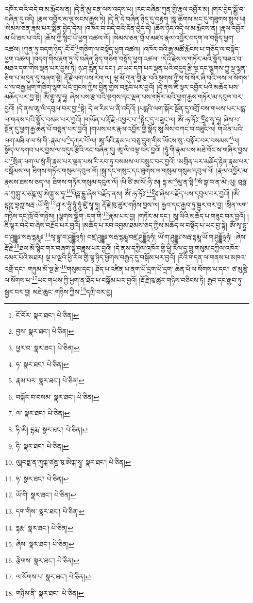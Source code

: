 འཁོར་བའི་བདེ་བ་མ་རྨོངས་ན། །དེ་ནི་མྱ་ངན་ལས་འདས་པ། །རང་བཞིན་ཀུན་གྱི་རྣལ་འབྱོར་མ། །གར་བྱེད་སྨྱོ་བ་བཞིན་དུ་འདི། །རྣལ་འབྱོར་མ་ལྔ་སངས་རྒྱས་ཏེ། །དེ་ནི་དེ་བཞིན་ཉིད་དུ་བརྟག །སྣ་ཆོགས་མང་དུ་གཟུགས་སྤྲུལ་པ། །སེམས་ཅན་རྣམ་པར་སྨིན་བྱེད་དེས། །འཁོར་བ་བདེ་བའི་དོན་བྱེད་དེ། །ཆོས་ཉིད་འདི་ལ་མ་རྨོངས་ན། །རྣལ་འབྱོར་མ་ཡི་ཐར་པ་འདི། །ཆོས་ཀྱི་སྙིང་པོ་ཕྱག་འཚལ་ལོ། །སེམས་ཅན་གྲོལ་མཛད་རྣལ་འབྱོར་བདག་ལ་བསྟོད་ཕྱག་འཚལ། །ཀུན་ཏུ་བདག་ཉིད་:ངོ་བོ་\footnote{ངོ་བོར་  སྣར་ཐང་།  པེ་ཅིན། }གཅིག་ལ་བསྟོད་ཕྱག་འཚལ། །འཁོར་བའི་རྒྱ་མཚོ་རྨོངས་པ་གཅོད་ལ་བསྟོད་ཕྱག་འཚལ། །བདག་གིས་རྟག་ཏུ་དེ་བཞིན་ཉིད་གཅིག་བསྟོད་ཕྱག་འཚལ། །དེའི་རྗེས་ལ་གཏོར་མའི་སྣོད་བཟའ་བ་མཐའ་དག་གིས་ལྡན་པར་བྱས་ཏེ། ཉ་ཤ་རློན་པ་དང་། ཤ་ཡང་དག་པར་ལྡན་པའི་བདུད་རྩི་ལྔ་དང་ལྕགས་ཀྱུ་ལྔ་ལྷན་ཅིག་པ་མདུན་དུ་བཞག་སྟེ། རྡོ་རྗེ་ལག་པས་རེག་ལ། ལྷ་མོ་ཀུན་གྱི་རྩ་བའི་སྔགས་ཀྱིས་སོ་སོར་ཞི་བའི་ལས་ལ་སོགས་པ་ལ་བརྒྱ་ཕྲག་གཅིག་ལྷག་པའི་གྲངས་ཀྱིས་བྱིན་གྱིས་བརླབ་པར་བྱའོ། །དེ་ནས་ཇི་ལྟར་འབྱོར་པའི་མཆོད་པས་མཆོད་པར་བྱ་སྟེ། ཨོཾ་གྷུ་སྭཱ་ཧཱ། ཞེས་པས་རྩ་བའི་སྔགས་དང་ལྡན་པས་གཏོར་མའི་ཕྱག་རྒྱས་གཏོར་མ་དབུལ་བར་བྱའོ། །དེ་ནས་ཨཱ་ལི་དབུལ་བར་བྱ་\footnote{བྱས་  སྣར་ཐང་།  པེ་ཅིན། }སྟེ། དེ་ལ་རིམ་པ་ནི་འདིའོ། །པདྨའི་ལག་སྐོར་སྔོན་དུ་འགྲོ་བས་གཡས་པར་པདྨ་ལ་གནས་པའི་སྣོད་བསམ་པར་བྱའོ། །གཡོན་པ་རྡོ་རྗེ་:འཕྱར་བ་\footnote{ཕྱར་བ་  སྣར་ཐང་།  པེ་ཅིན། }སྟེང་དུ་བཟུང་ལ། ཨོཾ་:ཧ་ཧོཿ་\footnote{ཧ་  སྣར་ཐང་།  པེ་ཅིན། }ཧྲཱིཿ་སྭཱ་ཧཱ། ཞེས་པ་སྔོན་དུ་ཕྱག་རྒྱ་ཆེན་པོ་བསྟན་པར་བྱའོ། །གཡས་པར་རྣལ་འབྱོར་གྱི་སྣོད་ཨཱ་ལིས་བཀང་བ་བཟུང་ལ། གཡོན་པའི་ལག་མཐིལ་ལ་སཾ་གི་:རྣམ་པ་\footnote{རྣམ་པར་  སྣར་ཐང་།  པེ་ཅིན། }དཀར་པོ་ལ། ཨཱ་ལིའི་རྣམ་པ་བཅུ་དྲུག་གིས་ཡོངས་སུ་:བསྐོར་བར་བསམས་\footnote{བསྐོར་བ་བསམ་  སྣར་ཐང་།  པེ་ཅིན། }ལ། སྣོད་ལ་དགབ་པར་བྱས་ལ་བདུད་རྩིའི་རང་བཞིན་དུ། ཨཱ་ལི་བལྟ་བར་བྱའོ། །ཧཱུཾ་གི་རྣམ་པས་མཐེ་བོང་ས་གཞིར་བྱས་པ་\footnote{ལ་  སྣར་ཐང་།  པེ་ཅིན། }སྲིན་ལག་ལ་སུཾ་གི་རྣམ་པར་ལྡན་པས་རི་རབ་ཏུ་བསམས་ལ་བསྲུང་བར་བྱའོ། །མགྲིན་པར་མཆོད་རྟེན་རྣམ་པར་བསྒོམས་ལ། ཐིགས་གཏོར་གསུམ་དབུལ་ལོ། །སྐུ་དང་གསུང་དང་ཐུགས་ལ་གསུམ་གསུམ་དབུལ་ལོ། །རྣལ་འབྱོར་མ་རྣམས་ཐམས་ཅད་ལ། ཐིགས་གཏོར་གསུམ་དབུལ་ལོ། །པི་ཙི་ཨ་སོ་:ཧི་ཨ། དྷ་མ་\footnote{ཧི་ཨི། དྷརྨ་  སྣར་ཐང་།  པེ་ཅིན། }མུ་ན་སྟི་\footnote{ཧི་  སྣར་ཐང་།  པེ་ཅིན། }སཾ་བྷ་བ་ན་མེ་:ལུ། བྲཧྨ་ན་ཀུཀྐུ་ར་ཙཎྜ་ལུ་ཨེཀྐུ་ས་ཧཱ་\footnote{ལུ།བཏྨ་ན་ཀུཀྐ་ཙཎྜ་ཁུ་ཨེཀྐ་སྭཱ་  སྣར་ཐང་།  པེ་ཅིན། }བེཧྑ་དྪུ་ཞེས་བརྗོད་ནས། ཨོཾ་:ཧ་ཧོཿ་\footnote{ཧ་  སྣར་ཐང་།  པེ་ཅིན། }ཧྲཱིཿ་ཞེས་བརྗོད་པས་དབུལ་བར་བྱའོ། །ཨོཾ་བྷཀྵ་བྷཀྵ་སརྦ་:ཡོ་གཱི་\footnote{ཡོ་གི་  སྣར་ཐང་།  པེ་ཅིན། }ཤྭ་ར་ཧཱུཾ་ཧཱུཾ་ཧཱུཾ་ཛུཾ་སྭཱ་ཧཱ། རྡོ་རྗེ་ཁུ་ཚུར་གཉིས་བྱས་ལ། རྒྱབ་དང་རྒྱབ་ཏུ་སྦྱར་བར་བྱ། །སྲིན་ལག་གཉིས་དང་ཁྲོ་བོ་གཉིས། །ལྕགས་སྒྲོག་:དག་གི་\footnote{དག་གིས་  སྣར་ཐང་།  པེ་ཅིན། }རྣམ་པར་བྱ། །གཏོར་མ་དང་། ཨཱ་ལིའི་མཆོད་པ་གཟུང་བར་བྱའོ། །ཇི་ལྟར་བདེ་བ་ཞེས་བརྗོད་པར་བྱའོ། །མཆོད་པ་རབ་འབྱམ་ཐམས་ཅད་ཀྱིས་མཆོད་ལ་བསྟོད་པ་ཡང་བྱ་སྟེ། ཨོཾ་སྭ་བྷཱ་བ་ཤུདྡྷཿ་སརྦ་དྷརྨཱཿ་\footnote{དྷརྨ་  སྣར་ཐང་།  པེ་ཅིན། }སྭ་བྷཱ་བ་ཤུདྡྷོ྅ཧཾ། བཛྲ་ཤུདྡྷཿ་སརྦ་དྷརྨཱ་བཛྲ་ཤུདྡྷོ྅ཧཾ། ཡོ་ག་ཤུདྡྷཿ་སརྦ་དྷརྨཱ་ཡོ་ག་ཤུདྡྷོ྅ཧཾ། :ཞེས་རྡོ་རྗེ་\footnote{ཞེས་  སྣར་ཐང་།  པེ་ཅིན། }ཐལ་མོ་སྙིང་གར་བཞག་སྟེ་བཟླས་པར་བྱའོ། །དེ་ནས་དཀྱིལ་འཁོར་གྱི་ཕྱི་རོལ་དུ་གྲུ་གསུམ་དཀྱིལ་འཁོར་དམར་པོའི་མཐར། ལྔ་པ་ལྔའི་ཕྱི་རོལ་གྱི་ལྷ་ཉིད་ཕྱོགས་བརྒྱད་དུ་བསྒོམ་པར་བྱའོ། །རོའི་གདན་ལ་གནས་པ་མཁའ་འགྲོ་དང་། གཏུམ་མོ་ལྔ་རྩེ་\footnote{རྩེགས་  སྣར་ཐང་།  པེ་ཅིན། }གསུམ་དང་། ཐོད་པ་འཛིན་པ་ནག་པོ་དྲག་པོ་དྲག་:ཆེན་པོ་ལ་སོགས་པ་དང་། ཙ་མུཎྜི་ལ་སོགས་པ་\footnote{ལ་སོགས་པ་  སྣར་ཐང་།  པེ་ཅིན། }ཡང་གཡས་ཀྱི་ཕྱག་ན་ཐོད་པ་བསྒོམ་པར་བྱའོ། །རྡོ་རྗེ་ཁུ་ཚུར་གཉིས་བཅིངས་ཏེ། རྒྱབ་དང་རྒྱབ་ཏུ་སྦྱར་བར་བྱ། མཐེ་ཆུང་:གཉིས་ཀྱིས་\footnote{གཉིས་ནི་  སྣར་ཐང་།  པེ་ཅིན། }དཀྲི་བར་བྱ། 